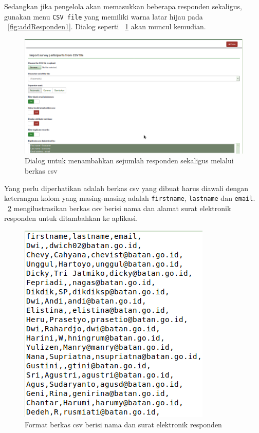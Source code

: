 Sedangkan jika pengelola akan memasukkan beberapa responden sekaligus, gunakan menu \texttt{CSV file} yang memiliki warna latar hijau pada \figurename~\ref{fig:addResponden1}. Dialog seperti \figurename~\ref{fig:csv} akan muncul kemudian. 

\begin{figure}
  \begin{center}
    \includegraphics[scale=.5]{pics/csvFile.png}
    \caption{Dialog untuk menambahkan sejumlah responden sekaligus melalui berkas csv}
    \label{fig:csv}
  \end{center}
\end{figure}

Yang perlu diperhatikan adalah berkas csv yang dibuat harus diawali dengan keterangan kolom yang masing-masing adalah \texttt{firstname}, \texttt{lastname} dan \texttt{email}. \figurename~\ref{fig:csvFile1} mengilustrasikan berkas csv berisi nama dan alamat surat elektronik responden untuk ditambahkan ke aplikasi. 

\begin{figure}
  \begin{center}
    \includegraphics[scale=.5]{pics/csvFile1.png}
    \caption{Format berkas csv berisi nama dan surat elektronik responden}
    \label{fig:csvFile1}
  \end{center}
\end{figure}


